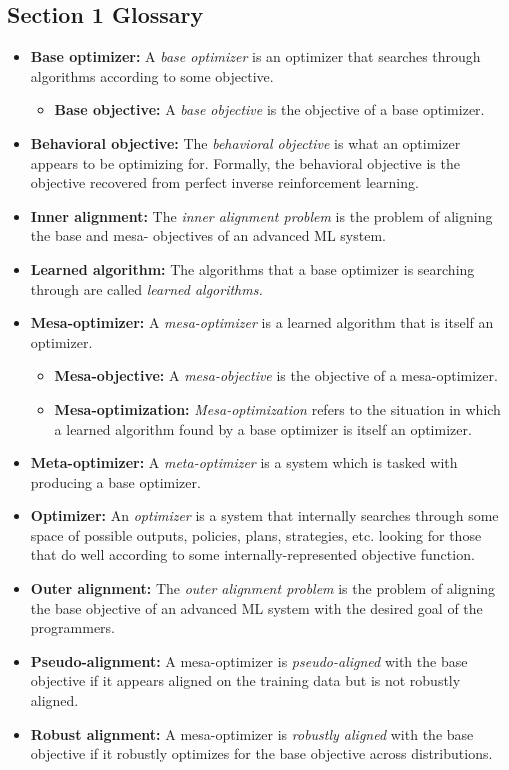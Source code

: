 \documentclass[
  onecolumn,
  natbib,
]{miri-tech-article}
\begin{document}
\subsection{Section 1 Glossary}
\begin{itemize}
\item \textbf{Base optimizer:} A \textit{base optimizer} is an optimizer that searches through algorithms according to some objective.
  \begin{itemize}
  \item \textbf{Base objective:} A \textit{base objective} is the objective of a base optimizer.
  \end{itemize}
\item \textbf{Behavioral objective:} The \textit{behavioral objective} is what an optimizer appears to be optimizing for. Formally, the behavioral objective is the objective recovered from perfect inverse reinforcement learning.
\item \textbf{Inner alignment:} The \textit{inner alignment problem} is the problem of aligning the base and mesa- objectives of an advanced ML system.
\item \textbf{Learned algorithm:} The algorithms that a base optimizer is searching through are called \textit{learned algorithms.}
\item \textbf{Mesa-optimizer:} A \textit{mesa-optimizer} is a learned algorithm that is itself an optimizer.
  \begin{itemize}
  \item \textbf{Mesa-objective:} A \textit{mesa-objective} is the objective of a mesa-optimizer.
  \item \textbf{Mesa-optimization:} \textit{Mesa-optimization} refers to the situation in which a learned algorithm found by a base optimizer is itself an optimizer.
  \end{itemize}
\item \textbf{Meta-optimizer:} A \textit{meta-optimizer} is a system which is tasked with producing a base optimizer.
\item \textbf{Optimizer:} An \textit{optimizer} is a system that internally searches through some space of possible outputs, policies, plans, strategies, etc. looking for those that do well according to some internally-represented objective function.
\item \textbf{Outer alignment:} The \textit{outer alignment problem} is the problem of aligning the base objective of an advanced ML system with the desired goal of the programmers.
\item \textbf{Pseudo-alignment:} A mesa-optimizer is \textit{pseudo-aligned} with the base objective if it appears aligned on the training data but is not robustly aligned.
\item \textbf{Robust alignment:} A mesa-optimizer is \textit{robustly aligned} with the base objective if it robustly optimizes for the base objective across distributions.
\end{itemize}
\end{document}
